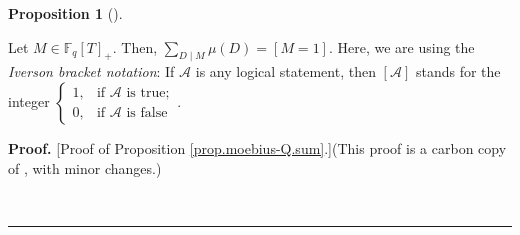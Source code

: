 \documentclass[numbers=enddot,12pt,final,onecolumn,notitlepage]{scrartcl}%
\theoremstyle{definition}
\newtheorem{prop}[theo]{Proposition}
\newenvironment{proposition}[1][]
{\begin{prop}[#1]\begin{leftbar}}
{\end{leftbar}\end{prop}}
\newenvironment{proof}[1][Proof]{\noindent\textbf{#1.} }{\ \rule{0.5em}{0.5em}}
\let\sumnonlimits\sum
\renewcommand{\sum}{\sumnonlimits\limits}
\begin{document}
\begin{proposition}
\label{prop.moebius-Q.sum}Let $M\in\mathbb{F}_{q}\left[  T\right]  _{+}$.
Then, $\sum_{D\mid M}\mu\left(  D\right)  =\left[  M=1\right]  $. Here, we are
using the \textit{Iverson bracket notation}: If $\mathcal{A}$ is any logical
statement, then $\left[  \mathcal{A}\right]  $ stands for the integer $%
\begin{cases}
1, & \text{if }\mathcal{A}\text{ is true};\\
0, & \text{if }\mathcal{A}\text{ is false}%
\end{cases}
$.
\end{proposition}

\begin{proof}
[Proof of Proposition \ref{prop.moebius-Q.sum}.](This proof is a carbon copy
of \cite[proof of (13.84.3)]{reiner-hopf}, with minor changes.)


\end{proof}
\end{document}

